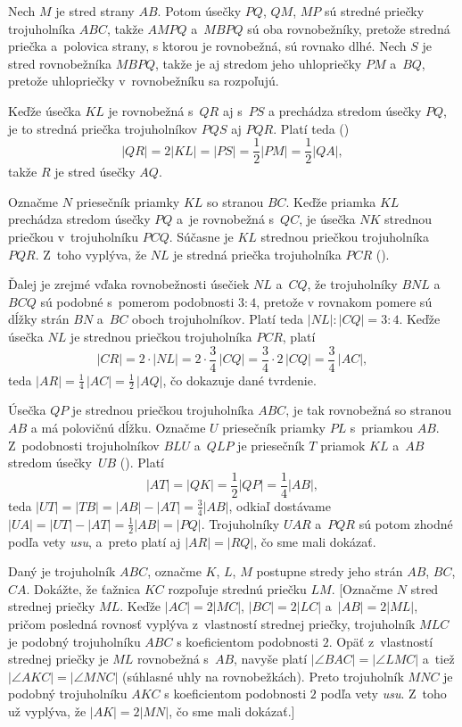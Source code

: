 {%
Nech $M$ je stred strany $AB$.
Potom úsečky $PQ$, $QM$, $MP$ sú stredné priečky trojuholníka $ABC$,
takže $AMPQ$ a~$MBPQ$ sú oba rovnobežníky, pretože stredná priečka a~polovica strany, s ktorou je rovnobežná, sú rovnako dlhé.
Nech $S$ je stred rovnobežníka $MBPQ$,
takže je aj stredom jeho uhlopriečky $PM$ a~$BQ$, pretože uhlopriečky v~rovnobežníku sa rozpoľujú.
%

Keďže úsečka $KL$ je rovnobežná s~$QR$ aj s~$PS$ a prechádza stredom úsečky $PQ$,
je to stredná priečka trojuholníkov $PQS$ aj $PQR$.
Platí teda (\obr)
$$|QR|
=2|KL|
=|PS|
=\frac12|PM|
=\frac12|QA|,$$
takže $R$ je stred úsečky $AQ$.

\ineriesenie
Označme $N$ priesečník priamky $KL$ so stranou $BC$. Keďže priamka $KL$ prechádza stredom úsečky $PQ$ a~je rovnobežná s~$QC$, je úsečka $NK$ strednou priečkou v~trojuholníku $PCQ$. Súčasne je $KL$ strednou priečkou
trojuholníka $PQR$. Z~toho vyplýva, že $NL$ je stredná priečka trojuholníka $PCR$ (\obr).
%

Ďalej je zrejmé vďaka rovnobežnosti úsečiek $NL$ a~$CQ$, že trojuholníky $BNL$ a~$BCQ$ sú podobné s~pomerom podobnosti $3:4$, pretože v rovnakom pomere sú dĺžky strán $BN$ a~$BC$ oboch trojuholníkov. Platí teda $|NL|:|CQ|=3:4$. Keďže úsečka $NL$ je strednou priečkou
trojuholníka $PCR$, platí
 $$|CR|=2\cdot|NL|=2\cdot\frac34\,|CQ|=\frac34\cdot 2\,|CQ|=\frac34\,|AC|,$$
teda $|AR|=\frac14\,|AC|=\frac12\,|AQ|$, čo dokazuje dané tvrdenie.

\ineriesenie
Úsečka $QP$ je strednou priečkou trojuholníka $ABC$, je tak rovnobežná so stranou $AB$ a má polovičnú dĺžku.
Označme $U$ priesečník priamky $PL$ s~priamkou $AB$. Z~podobnosti
 trojuholníkov $BLU$ a~$QLP$ je priesečník $T$ priamok $KL$ a~$AB$ stredom úsečky~$UB$ (\obr). Platí
$$|AT|=|QK|=\frac12|QP|=\frac14|AB|,$$
teda $|UT|=|TB|=|AB|-|AT|=\frac34|AB|$, odkiaľ dostávame $|UA|=|UT|-|AT|=\frac12|AB|=|PQ|$.
Trojuholníky $UAR $ a~$PQR $ sú potom zhodné podľa vety \emph{usu}, a~preto platí aj $|AR| = |RQ|$, čo sme mali dokázať.
%


Daný je trojuholník $ABC$, označme $K$, $L$, $M$ postupne stredy jeho strán $AB$, $BC$, $CA$. Dokážte, že ťažnica $KC$ rozpoľuje strednú priečku $LM$.
[Označme $N$ stred strednej priečky $ML$. Keďže $|AC|=2|MC|$, $|BC|=2|LC|$ a~$|AB|=2|ML|$, pričom posledná rovnosť vyplýva z~vlastností strednej priečky, trojuholník $MLC$ je podobný trojuholníku $ABC$ s koeficientom podobnosti $2$.
Opäť z~vlastností strednej priečky je $ML$ rovnobežná s~$AB$, navyše platí $|\angle BAC| = |\angle LMC|$ a~tiež $|\angle AKC| = |\angle MNC|$ (súhlasné uhly na rovnobežkách).
Preto trojuholník $MNC$ je podobný trojuholníku $AKC$ s koeficientom podobnosti $2$ podľa vety {\it usu}.
Z~toho už vyplýva, že $|AK|=2|MN|$, čo sme mali dokázať.]

}
